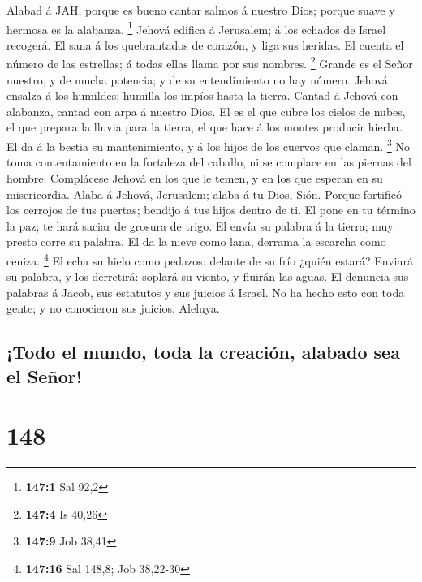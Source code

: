  Alabad á JAH, porque es bueno cantar salmos á nuestro Dios;
porque suave y hermosa es la alabanza. \footnote{\textbf{147:1} Sal 92,2}
 Jehová edifica á Jerusalem; á los echados de Israel
recogerá.  El sana á los quebrantados de corazón, y liga sus
heridas.  El cuenta el número de las estrellas; á todas
ellas llama por sus nombres. \footnote{\textbf{147:4} Is 40,26}
 Grande es el Señor nuestro, y de mucha potencia; y de su
entendimiento no hay número.  Jehová ensalza á los humildes;
humilla los impíos hasta la tierra.  Cantad á Jehová con
alabanza, cantad con arpa á nuestro Dios.  El es el que
cubre los cielos de nubes, el que prepara la lluvia para la tierra, el
que hace á los montes producir hierba.  El da á la bestia su
mantenimiento, y á los hijos de los cuervos que claman. \footnote{\textbf{147:9}
  Job 38,41}  No toma contentamiento en la fortaleza del
caballo, ni se complace en las piernas del hombre. 
Complácese Jehová en los que le temen, y en los que esperan en su
misericordia.  Alaba á Jehová, Jerusalem; alaba á tu Dios,
Sión.  Porque fortificó los cerrojos de tus puertas;
bendijo á tus hijos dentro de ti.  El pone en tu término la
paz; te hará saciar de grosura de trigo.  El envía su
palabra á la tierra; muy presto corre su palabra.  El da la
nieve como lana, derrama la escarcha como ceniza. \footnote{\textbf{147:16}
  Sal 148,8; Job 38,22-30}  El echa su hielo como pedazos:
delante de su frío ¿quién estará?  Enviará su palabra, y
los derretirá: soplará su viento, y fluirán las aguas.  El
denuncia sus palabras á Jacob, sus estatutos y sus juicios á Israel.
 No ha hecho esto con toda gente; y no conocieron sus
juicios. Aleluya.

\hypertarget{todo-el-mundo-toda-la-creaciuxf3n-alabado-sea-el-seuxf1or}{%
\subsection{¡Todo el mundo, toda la creación, alabado sea el
Señor!}\label{todo-el-mundo-toda-la-creaciuxf3n-alabado-sea-el-seuxf1or}}

\hypertarget{section-147}{%
\section{148}\label{section-147}}

